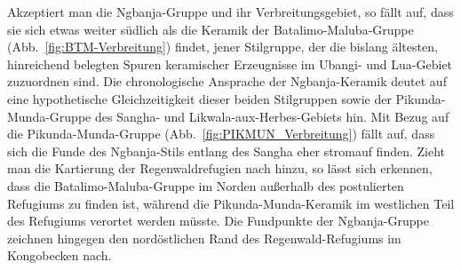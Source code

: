 Akzeptiert man die \mbox{Ngbanja}-Gruppe und ihr Verbreitungsgebiet, so fällt auf, dass sie sich etwas weiter südlich als die Keramik der Batalimo-Maluba-Gruppe (Abb.~\ref{fig:BTM-Verbreitung}) findet, jener Stilgruppe, der die bislang ältesten, hinreichend belegten Spuren keramischer Erzeugnisse im \mbox{Ubangi}- und Lua-Gebiet zuzuordnen sind. Die chronologische Ansprache der \mbox{Ngbanja}-Keramik deutet auf eine hypothetische Gleichzeitigkeit dieser beiden Stilgruppen sowie der Pikunda-Munda-Gruppe des \mbox{Sangha}- und Likwala-aux-Herbes-Gebiets hin. Mit Bezug auf die Pikunda-Munda-Gruppe (Abb.~\ref{fig:PIKMUN_Verbreitung}) fällt auf, dass sich die Funde des \mbox{Ngbanja}-Stils entlang des \mbox{Sangha} eher stromauf finden. Zieht man die Kartierung der Regenwaldrefugien nach \textcite[7 Abb.~4]{Maley.2001} hinzu, so lässt sich erkennen, dass die Batalimo-Maluba-Gruppe im Norden außerhalb des postulierten Refugiums zu finden ist, während die Pikunda-Munda-Keramik im westlichen Teil des Refugiums verortet werden müsste. Die Fundpunkte der \mbox{Ngbanja}-Gruppe zeichnen hingegen den nordöstlichen Rand des Regenwald-Refugiums im Kongobecken nach. 